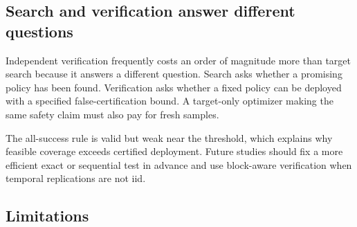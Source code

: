 \subsection{Search and verification answer different questions}

Independent verification frequently costs an order of magnitude more than
target search because it answers a different question.  Search asks whether a
promising policy has been found.  Verification asks whether a fixed policy can
be deployed with a specified false-certification bound.  A target-only
optimizer making the same safety claim must also pay for fresh samples.

The all-success rule is valid but weak near the threshold, which explains why
feasible coverage exceeds certified deployment.  Future studies should fix a
more efficient exact or sequential test in advance and use block-aware
verification when temporal replications are not iid.

\subsection{Limitations}

